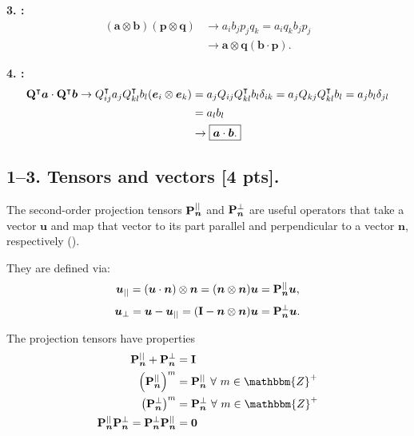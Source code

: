 \textbf{3. :}
\begin{align*}
    (\bm{a} \otimes \bm{b})(\bm{p} \otimes \bm{q}) &\rightarrow a_i b_j p_j q_k = a_i q_k b_j p_j\\
    &\rightarrow \boxed{\bm{a} \otimes \bm{q} (\bm{b} \cdot \bm{p}).}
\end{align*}

\textbf{4. :}
\begin{align*}
    \mathbf{Q}^\intercal\bm{a} \cdot \mathbf{Q}^\intercal\bm{b} \rightarrow Q_{ij}^\intercal a_j Q_{kl}^\intercal b_l (\bm{e}_i \otimes \bm{e}_k) &= a_j Q_{ij} Q_{kl}^\intercal b_l \delta_{ik} = a_j Q_{kj} Q_{kl}^\intercal b_l = a_j b_l \delta_{jl}\\
    &= a_l b_l\\
    &\rightarrow \boxed{\bm{a} \cdot \bm{b}.}
\end{align*}

\newpage
\subsection*{1--3. \textbf{Tensors and vectors} [4 pts].}
The second-order projection tensors $\mathbf{P}_{\bm{n}}^{||}$ and $\mathbf{P}_{\bm{n}}^{\perp}$ are useful operators that take a vector $\bm{u}$ and map that vector to its part parallel and perpendicular to a vector $\bm{n}$, respectively (\cite{holzapfelNonlinearSolidMechanics2002}).

They are defined via:
\begin{equation*}
    \bm{u}_{||} = (\bm{u} \cdot \bm{n}) \otimes \bm{n} = (\bm{n} \otimes \bm{n}) \bm{u} = \mathbf{P}_{\bm{n}}^{||} \bm{u},
\end{equation*}
\begin{equation*}
    \bm{u}_{\perp} = \bm{u} - \bm{u}_{||} = (\mathbf{I} - \bm{n} \otimes \bm{n}) \bm{u} = \mathbf{P}_{\bm{n}}^{\perp} \bm{u}.
\end{equation*}

The projection tensors have properties
\begin{align*}
    \bn{P}_{\bm{n}}^{||} + \bn{P}_{\bm{n}}^{\perp} &= \bn{I} \\
    \left(\bn{P}_{\bm{n}}^{||} \right)^m &= \bn{P}_{\bm{n}}^{||} ~\forall ~m \in \mathbbm{Z}^+\\
    \left(\bn{P}_{\bm{n}}^{\perp} \right)^m &= \bn{P}_{\bm{n}}^{\perp} ~\forall ~m \in \mathbbm{Z}^+\\
    \bn{P}_{\bm{n}}^{||} \bn{P}_{\bm{n}}^{\perp} = \bn{P}_{\bm{n}}^{\perp} \bn{P}_{\bm{n}}^{||}  &= \bn{0}
\end{align*}

